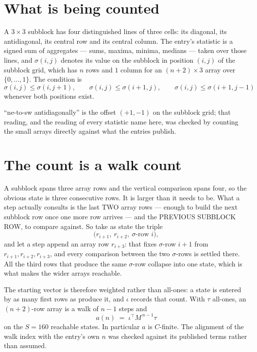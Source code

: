 \documentclass[11pt,a4paper]{article}
\theoremstyle{plain}
\theoremstyle{definition}
\begin{document}
\section{What is being counted}

A $3\times3$ subblock has four distinguished lines of three cells: its diagonal, its
antidiagonal, its central row and its central column. The entry's statistic is a signed sum of
aggregates --- sums, maxima, minima, medians --- taken over those lines, and $\sigma(i,j)$
denotes its value on the subblock in position $(i,j)$ of the subblock grid, which has $n$ rows
and $1$ column for an $(n+2)\times3$ array over $\{0,\dots,1\}$. The condition is
\[
\sigma(i,j)\le\sigma(i,j+1),\qquad \sigma(i,j)\le\sigma(i+1,j),\qquad \sigma(i,j)\le\sigma(i+1,j-1)
\]
whenever both positions exist.

``ne-to-sw antidiagonally'' is the offset $(+1,-1)$ on the subblock grid; that reading, and
the reading of every statistic name here, was checked by counting the small arrays directly
against what the entries publish.

\section{The count is a walk count}

A subblock spans three array rows and the vertical comparison spans four, so the obvious state
is three consecutive rows. It is larger than it needs to be. What a step actually consults is
the last TWO array rows --- enough to build the next subblock row once one more row arrives ---
and the PREVIOUS SUBBLOCK ROW, to compare against. So take as state the triple
\[
\bigl(r_{i+1},\ r_{i+2},\ \sigma\text{-row }i\bigr),
\]
and let a step append an array row $r_{i+3}$: that fixes $\sigma$-row $i+1$ from
$r_{i+1},r_{i+2},r_{i+3}$, and every comparison between the two $\sigma$-rows is settled
there. All the third rows that produce the same $\sigma$-row collapse into one state, which is
what makes the wider arrays reachable.

The starting vector is therefore weighted rather than all-ones: a state is entered by as many
first rows as produce it, and $\iota$ records that count. With $\tau$ all-ones, an
$(n+2)$-row array is a walk of $n-1$ steps and
\[
a(n)\;=\;\iota^{\!\top}M^{\,n-1}\tau
\]
on the $S=160$ reachable states. In particular $a$ is $C$-finite. The alignment of the walk
index with the entry's own $n$ was checked against its published terms rather than assumed.
\end{document}
